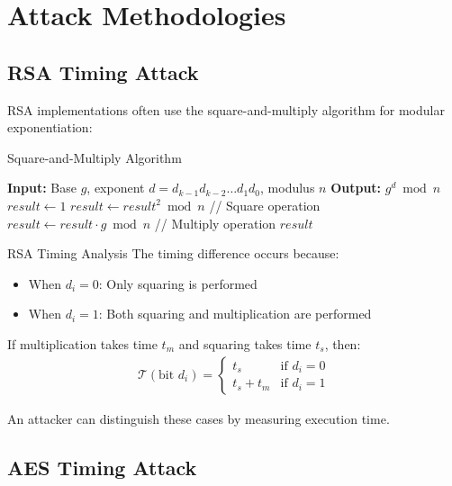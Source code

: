 \documentclass[12pt,a4paper]{article}
\theoremstyle{definition}
\newcommand{\time}[1]{\mathcal{T}\left(#1\right)}
\begin{document}
\section{Attack Methodologies}

\subsection{RSA Timing Attack}

RSA implementations often use the square-and-multiply algorithm for modular exponentiation:

\begin{algorithmbox}{Square-and-Multiply Algorithm}
\begin{algorithmic}
\STATE \textbf{Input:} Base $g$, exponent $d = d_{k-1}d_{k-2}\ldots d_1d_0$, modulus $n$
\STATE \textbf{Output:} $g^d \bmod n$
\STATE $result \leftarrow 1$
    \STATE $result \leftarrow result^2 \bmod n$ \quad // Square operation
        \STATE $result \leftarrow result \cdot g \bmod n$ \quad // Multiply operation
    \ENDIF
\ENDFOR
\RETURN $result$
\end{algorithmic}
\end{algorithmbox}

\begin{examplebox}{RSA Timing Analysis}
The timing difference occurs because:
\begin{itemize}
    \item When $d_i = 0$: Only squaring is performed
    \item When $d_i = 1$: Both squaring and multiplication are performed
\end{itemize}

If multiplication takes time $t_m$ and squaring takes time $t_s$, then:
\begin{align}
\time{\text{bit } d_i} = \begin{cases}
t_s & \text{if } d_i = 0 \\
t_s + t_m & \text{if } d_i = 1
\end{cases}
\end{align}

An attacker can distinguish these cases by measuring execution time.
\end{examplebox}

\subsection{AES Timing Attack}
\end{document}
